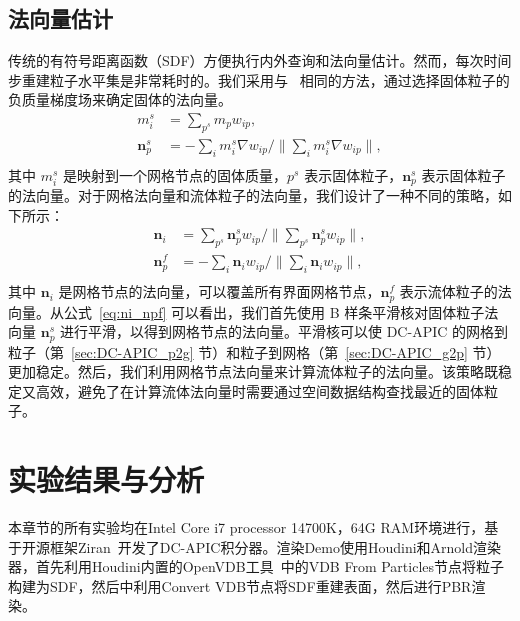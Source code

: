 \subsection{法向量估计}
传统的有符号距离函数（SDF）方便执行内外查询和法向量估计。然而，每次时间步重建粒子水平集是非常耗时的。我们采用与~\cite{fang2020iq} 相同的方法，通过选择固体粒子的负质量梯度场来确定固体的法向量。
\begin{equation}
\begin{aligned}
m_i^s &= \sum_{p^s} m_p w_{ip},\\
\mathbf{n}_p^s &= -\sum_i m_i^s \nabla w_{ip} / \| \sum_i m_i^s \nabla w_{ip} \| ,\\
\end{aligned}
\end{equation}
其中 $m_i^s$ 是映射到一个网格节点的固体质量，$p^s$ 表示固体粒子，$\mathbf{n}_p^s$ 表示固体粒子的法向量。对于网格法向量和流体粒子的法向量，我们设计了一种不同的策略，如下所示：
\begin{equation}
\label{eq:ni_npf}
\begin{aligned}
\mathbf{n}_i &= \sum_{p^s} \mathbf{n}_p^s w_{ip} / \| \sum_{p^s} \mathbf{n}_p^s w_{ip} \| ,\\
\mathbf{n}_p^f &= -\sum_i \mathbf{n}_i w_{ip} / \| \sum_i \mathbf{n}_i w_{ip} \|,\\
\end{aligned}
\end{equation}
其中 $\mathbf{n}_i$ 是网格节点的法向量，可以覆盖所有界面网格节点，$\mathbf{n}_p^f$ 表示流体粒子的法向量。从公式~\eqref{eq:ni_npf} 可以看出，我们首先使用 B 样条平滑核对固体粒子法向量 $\mathbf{n}_p^s$ 进行平滑，以得到网格节点的法向量。平滑核可以使 DC-APIC 的网格到粒子（第~\ref{sec:DC-APIC_p2g} 节）和粒子到网格（第~\ref{sec:DC-APIC_g2p} 节）更加稳定。然后，我们利用网格节点法向量来计算流体粒子的法向量。该策略既稳定又高效，避免了在计算流体法向量时需要通过空间数据结构查找最近的固体粒子。


\section{实验结果与分析}
本章节的所有实验均在Intel Core i7 processor 14700K，64G RAM环境进行，基于开源框架Ziran~\cite{fang2020iq}开发了DC-APIC积分器。渲染Demo使用Houdini和Arnold渲染器，首先利用Houdini内置的OpenVDB工具~\cite{museth2013vdb}中的VDB From Particles节点将粒子构建为SDF，然后中利用Convert VDB节点将SDF重建表面，然后进行PBR渲染。

